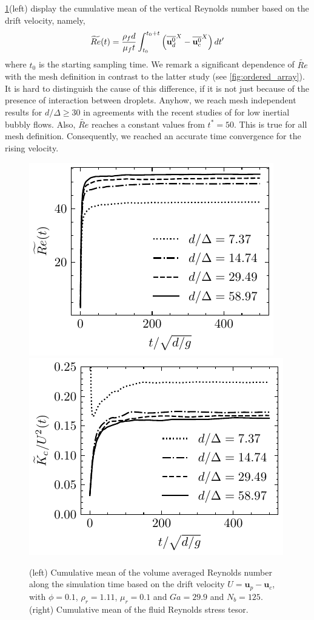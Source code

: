 \ref{fig:Re_and_Tc}(left) display the cumulative mean of the vertical Reynolds number based on the drift velocity, namely,
\begin{equation}
    \widetilde{Re}(t)
    = \frac{\rho_f d}{\mu_f t}\int_{t_0}^{t_0+t} \left(\overline{\textbf{u}^0_d}^X -  \overline{\textbf{u}_c^0}^X\right)dt'
\end{equation}
where $t_0$ is the starting sampling time. 
We remark a significant dependence of $\tilde{Re}$ with the mesh definition in contrast to the latter study (see \ref{fig:ordered_array}). 
It is hard to distinguish the cause of this difference, if it is not just because of the presence of interaction between droplets. 
Anyhow, we reach mesh independent results for $d/\Delta \geq 30$ in agreements with the recent studies of \citet{loisy2017buoyancy} \citet{zhang2021direct} for low inertial bubbly flows.
Also, $\widetilde{Re}$ reaches a constant values from $t^* = 50$. 
This is true for all mesh definition.  
Consequently, we reached an accurate time convergence for the rising velocity. 
\begin{figure}[h!]
    \centering
    \includegraphics[height = 0.35\textwidth]{image/VALIDATION2.0/fCA/Recum.pdf}
    \includegraphics[height = 0.35\textwidth]{image/VALIDATION2.0/fCA/Tcum.pdf}
    \caption{(left) Cumulative mean of the volume averaged Reynolds number along the simulation time based on the drift velocity $U = \textbf{u}_p - \textbf{u}_c$, with $\phi = 0.1$, $\rho_r = 1.11$, $ \mu_r =0.1$ and $Ga = 29.9$ and $N_b = 125$.
    (right) Cumulative mean of the fluid Reynolds stress tesor. }
    \label{fig:Re_and_Tc}
\end{figure}

